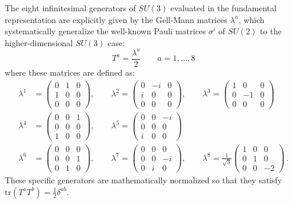 The eight infinitesimal generators of \(SU(3)\) evaluated in the fundamental representation are explicitly given by the Gell-Mann matrices \(\lambda^a\), which systematically generalize the well-known Pauli matrices \(\sigma^i\) of \(SU(2)\) to the higher-dimensional \(SU(3)\) case:
\begin{equation} \label{eq:gell_mann_def}
    T^a = \frac{\lambda^a}{2} \qquad a = 1, \dots, 8
\end{equation}
where these matrices are defined as:
\begin{equation} \label{eq:gell_mann_matrices}
    \begin{aligned}
        \lambda^1 & = \begin{pmatrix} 0 & 1 & 0 \\ 1 & 0 & 0 \\ 0 & 0 & 0 \end{pmatrix} , \qquad \lambda^2 = \begin{pmatrix} 0 & -i & 0 \\ i & 0 & 0 \\ 0 & 0 & 0 \end{pmatrix} , \qquad \lambda^3 = \begin{pmatrix} 1 & 0 & 0 \\ 0 & -1 & 0 \\ 0 & 0 & 0 \end{pmatrix}                         \\
        \lambda^4 & = \begin{pmatrix} 0 & 0 & 1 \\ 0 & 0 & 0 \\ 1 & 0 & 0 \end{pmatrix} , \qquad \lambda^5 = \begin{pmatrix} 0 & 0 & -i \\ 0 & 0 & 0 \\ i & 0 & 0 \end{pmatrix}                                                                                                                 \\
        \lambda^6 & = \begin{pmatrix} 0 & 0 & 0 \\ 0 & 0 & 1 \\ 0 & 1 & 0 \end{pmatrix} , \qquad \lambda^7 = \begin{pmatrix} 0 & 0 & 0 \\ 0 & 0 & -i \\ 0 & i & 0 \end{pmatrix} , \qquad \lambda^8 = \frac{1}{\sqrt{3}} \begin{pmatrix} 1 & 0 & 0 \\ 0 & 1 & 0 \\ 0 & 0 & -2 \end{pmatrix} \, .
    \end{aligned}
\end{equation}
These specific generators are mathematically normalized so that they satisfy \(\mathrm{tr}(T^a T^b) = \frac{1}{2}\delta^{ab}\).

